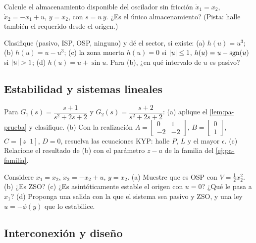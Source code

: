 \begin{problema}\label{prob:pa-disponible}
Calcule el almacenamiento disponible del oscilador sin fricción $\dot x_1=x_2$, $\dot x_2=-x_1+u$, $y=x_2$, con $s=u\,y$. ¿Es el único almacenamiento? (Pista: halle también el requerido desde el origen.)
\end{problema}

\begin{problema}[sectores]\label{prob:pa-sectores}
Clasifique (pasivo, ISP, OSP, ninguno) y dé el sector, si existe: (a) $h(u)=u^3$; (b) $h(u)=u-u^3$; (c) la zona muerta $h(u)=0$ si $\left\lvert u\right\rvert\le1$, $h(u)=u-\operatorname{sgn}(u)$ si $\left\lvert u\right\rvert>1$; (d) $h(u)=u+\sin u$. Para (b), ¿en qué intervalo de $u$ es pasivo?
\end{problema}

\subsection*{Estabilidad y sistemas lineales}

\begin{problema}\label{prob:pa-kyp}
Para $G_1(s)=\dfrac{s+1}{s^2+2s+2}$ y $G_2(s)=\dfrac{s+2}{s^2+2s+2}$: (a) aplique el \cref{lem:pa-prueba} y clasifique. (b) Con la realización $A=\begin{bmatrix}0&1\\-2&-2\end{bmatrix}$, $B=\begin{bmatrix}0\\1\end{bmatrix}$, $C=[z\;\;1]$, $D=0$, resuelva las ecuaciones KYP: halle $P$, $L$ y el mayor $\epsilon$. (c) Relacione el resultado de (b) con el parámetro $z-a$ de la familia del \cref{ej:pa-familia}.
\end{problema}

\begin{problema}\label{prob:pa-zso}
Considere $\dot x_1=x_2$, $\dot x_2=-x_2+u$, $y=x_2$. (a) Muestre que es OSP con $V=\tfrac12x_2^2$. (b) ¿Es ZSO? (c) ¿Es asintóticamente estable el origen con $u=0$? ¿Qué le pasa a $x_1$? (d) Proponga una salida con la que el sistema sea pasivo y ZSO, y una ley $u=-\phi(y)$ que lo estabilice.
\end{problema}

\subsection*{Interconexión y diseño}

